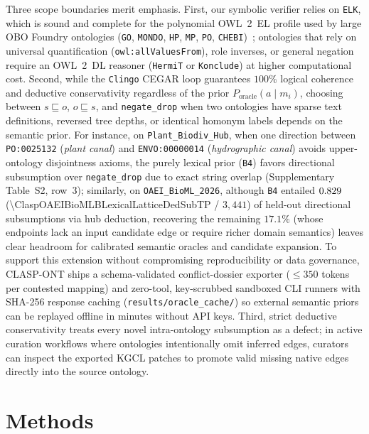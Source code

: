 \documentclass[10pt]{article}
\theoremstyle{accentdef}
\begin{document}
Three scope boundaries merit emphasis. First, our symbolic verifier relies on \texttt{ELK}, which is sound and complete for the polynomial OWL~2~EL profile used by large OBO Foundry ontologies (\texttt{GO}, \texttt{MONDO}, \texttt{HP}, \texttt{MP}, \texttt{PO}, \texttt{CHEBI})~\cite{kazakov2014elk,baader2005el}; ontologies that rely on universal quantification (\texttt{owl:allValuesFrom}), role inverses, or general negation require an OWL~2~DL reasoner (\texttt{HermiT} or \texttt{Konclude}) at higher computational cost. Second, while the \texttt{Clingo} CEGAR loop guarantees $100\%$ logical coherence and deductive conservativity regardless of the prior $P_{\mathrm{oracle}}(a \mid m_i)$, choosing between $s \sqsubseteq o$, $o \sqsubseteq s$, and \texttt{negate\_drop} when two ontologies have sparse text definitions, reversed tree depths, or identical homonym labels depends on the semantic prior. For instance, on \texttt{Plant\_Biodiv\_Hub}, when one direction between \texttt{PO:0025132} (\emph{plant canal}) and \texttt{ENVO:00000014} (\emph{hydrographic canal}) avoids upper-ontology disjointness axioms, the purely lexical prior (\texttt{B4}) favors directional subsumption over \texttt{negate\_drop} due to exact string overlap (Supplementary Table~S2, row~3); similarly, on \texttt{OAEI\_BioML\_2026}, although \texttt{B4} entailed $0.829{}$ (\num{\ClaspOAEIBioMLBLexicalLatticeDedSubTP} / $3{,}441$) of held-out directional subsumptions via hub deduction, recovering the remaining $17.1\%$ (whose endpoints lack an input candidate edge or require richer domain semantics) leaves clear headroom for calibrated semantic oracles and candidate expansion. To support this extension without compromising reproducibility or data governance, \textsc{CLASP-ONT} ships a schema-validated conflict-dossier exporter ($\le 350$ tokens per contested mapping) and zero-tool, key-scrubbed sandboxed CLI runners with SHA-256 response caching (\texttt{results/oracle\_cache/}) so external semantic priors can be replayed offline in minutes without API keys. Third, strict deductive conservativity treats every novel intra-ontology subsumption as a defect; in active curation workflows where ontologies intentionally omit inferred edges, curators can inspect the exported KGCL patches to promote valid missing native edges directly into the source ontology.

\section*{Methods}
\end{document}
